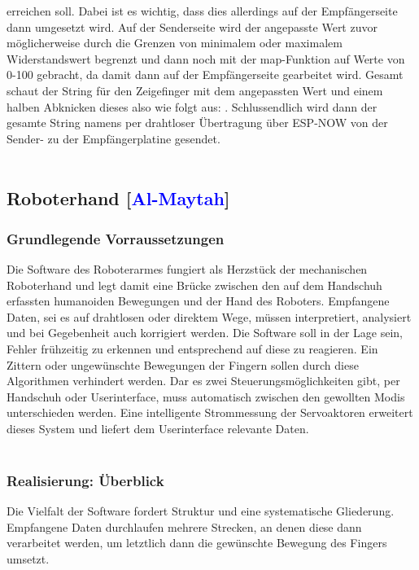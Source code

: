 \documentclass[titlepage,12pt,twoside]{article}
\begin{document}
erreichen soll. Dabei ist es wichtig, dass dies allerdings auf der Empfängerseite 
dann umgesetzt wird. Auf der Senderseite wird der angepasste Wert zuvor 
möglicherweise durch die Grenzen von minimalem oder maximalem Widerstandswert 
begrenzt und dann noch mit der map-Funktion auf Werte von 0-100 gebracht, da damit 
dann auf der Empfängerseite gearbeitet wird. Gesamt schaut der String für den 
Zeigefinger mit dem angepassten Wert und einem halben Abknicken dieses also wie 
folgt aus: . Schlussendlich wird dann der gesamte String namens 
 per drahtloser Übertragung über ESP-NOW von der Sender- zu der 
Empfängerplatine gesendet. \\
\\

\newpage
\subsection{Roboterhand [\textcolor{blue}{Al-Maytah}]}

\subsubsection{Grundlegende Vorraussetzungen}
Die Software des Roboterarmes fungiert als Herzstück der mechanischen Roboterhand und legt damit eine Brücke zwischen den auf dem Handschuh erfassten 
humanoiden Bewegungen und der Hand des Roboters. Empfangene Daten, sei es auf drahtlosen oder direktem Wege, müssen interpretiert, analysiert und bei 
Gegebenheit auch korrigiert werden. Die Software soll in der Lage sein, Fehler frühzeitig zu erkennen und entsprechend auf diese zu reagieren. Ein Zittern 
oder ungewünschte Bewegungen der Fingern sollen durch diese Algorithmen verhindert werden. Dar es zwei Steuerungsmöglichkeiten gibt, per Handschuh oder 
Userinterface, muss automatisch zwischen den gewollten Modis unterschieden werden. Eine intelligente Strommessung der Servoaktoren erweitert dieses 
System und liefert dem Userinterface relevante Daten. \\
\\

\subsubsection{Realisierung: Überblick}
\label{chap:Realisierung: Überblick}
Die Vielfalt der Software fordert Struktur und eine systematische Gliederung. Empfangene Daten durchlaufen mehrere Strecken, an denen diese dann 
verarbeitet werden, um letztlich dann die gewünschte Bewegung des Fingers umsetzt. \\
\\
\end{document}
